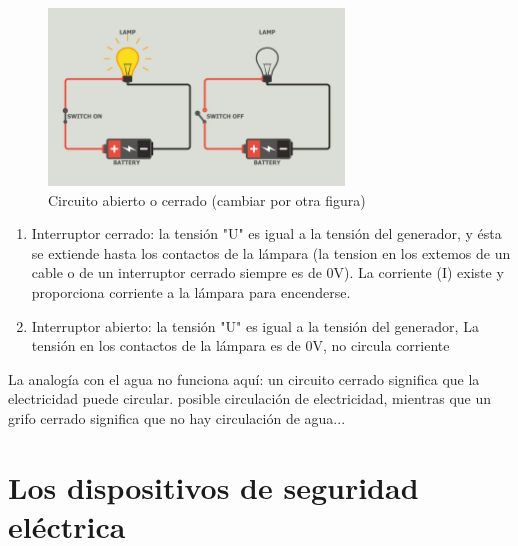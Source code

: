 \documentclass[a5paper,twoside,openany]{book}
\begin{document}
\begin{figure}[h]
\includegraphics[width=0.7\textwidth]{circuito-abierto-cerrado} 
\centering
\caption*{Circuito abierto o cerrado (cambiar por otra figura)}
\end{figure}

\begin{enumerate}
\item Interruptor cerrado: la tensión "U" es igual a la tensión del generador, y ésta se extiende hasta los contactos de la lámpara (la tension en los extemos de un cable o de un interruptor cerrado siempre es de 0V). La corriente (I) existe y proporciona corriente a la lámpara para encenderse.
\item Interruptor abierto: la tensión "U" es igual a la tensión del generador, La tensión en los contactos de la lámpara es de 0V, no circula corriente
\end{enumerate}
La analogía con el agua no funciona aquí: un circuito cerrado significa que la electricidad puede circular.
posible circulación de electricidad, mientras que un grifo cerrado significa que no hay
circulación de agua...

\section{Los dispositivos de seguridad eléctrica}
\end{document}
